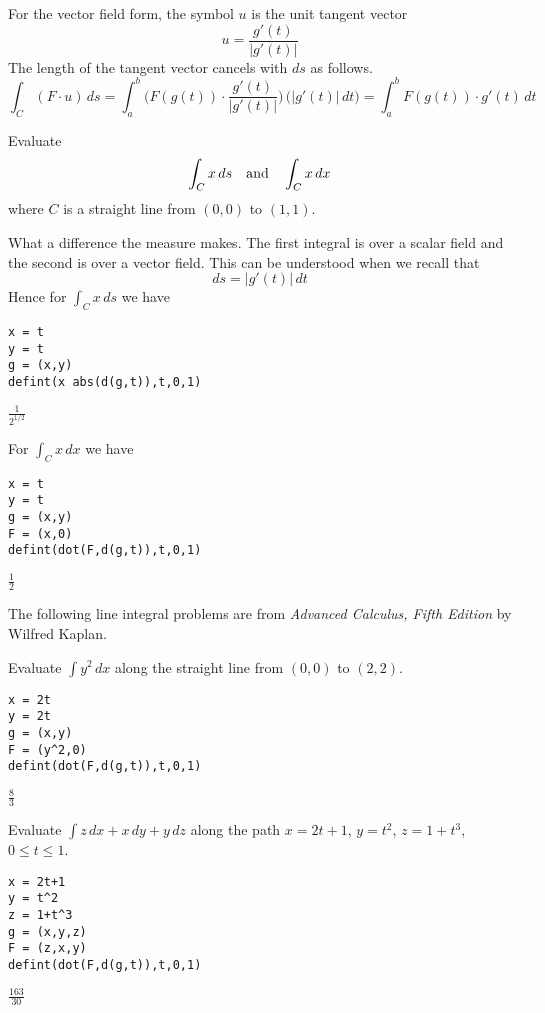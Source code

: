 \noindent
For the vector field form, the symbol $u$ is the unit tangent vector
$$u=\frac{g'(t)}{|g'(t)|}$$
The length of the tangent vector cancels with $ds$
as follows.
$$\int_C(F\cdot u)\,ds
=\int_a^b\bigg(F(g(t))\cdot\frac{g'(t)}{|g'(t)|}\bigg)\,\bigg(|g'(t)|\,dt\bigg)
=\int_a^b F(g(t))\cdot g'(t)\,dt
$$

\noindent
Evaluate
$$\int_Cx\,ds\quad\hbox{and}\quad\int_Cx\,dx$$
where $C$ is a straight line from $(0,0)$ to $(1,1)$.

\bigskip
\noindent
What a difference the measure makes.
The first integral is over a scalar field and the second is over a vector field.
This can be understood when we recall that
$$ds=|g'(t)|\,dt
$$
Hence for $\int_Cx\,ds$ we have

\begin{Verbatim}[formatcom=\color{blue},samepage=true]
x = t
y = t
g = (x,y)
defint(x abs(d(g,t)),t,0,1)
\end{Verbatim}

\noindent
$\displaystyle \frac{1}{2^{1/2}}$

\bigskip
\noindent
For $\int_Cx\,dx$ we have

\begin{Verbatim}[formatcom=\color{blue},samepage=true]
x = t
y = t
g = (x,y)
F = (x,0)
defint(dot(F,d(g,t)),t,0,1)
\end{Verbatim}

\noindent
$\displaystyle \tfrac{1}{2}$

\bigskip
\noindent
The following line integral problems are from
{\it Advanced Calculus, Fifth Edition} by Wilfred Kaplan.

\bigskip
\noindent
Evaluate $\int y^2\,dx$ along the straight
line from $(0,0)$ to $(2,2)$.

\begin{Verbatim}[formatcom=\color{blue},samepage=true]
x = 2t
y = 2t
g = (x,y)
F = (y^2,0)
defint(dot(F,d(g,t)),t,0,1)
\end{Verbatim}

\noindent
$\displaystyle \tfrac{8}{3}$

\bigskip
\noindent
Evaluate $\int z\,dx+x\,dy+y\,dz$
along the path
$x=2t+1$, $y=t^2$, $z=1+t^3$, $0\le t\le 1$.

\begin{Verbatim}[formatcom=\color{blue},samepage=true]
x = 2t+1
y = t^2
z = 1+t^3
g = (x,y,z)
F = (z,x,y)
defint(dot(F,d(g,t)),t,0,1)
\end{Verbatim}

\noindent
$\displaystyle \tfrac{163}{30}$
